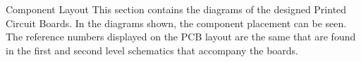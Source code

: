 \begin{customAppendixPage}{Component Layout}
This section contains the diagrams of the designed Printed Circuit Boards.  In the diagrams shown, the component placement can be seen.  The reference numbers displayed on the PCB layout are the same that are found in the first and second level schematics that accompany the boards.
\end{customAppendixPage}
\renewcommand*{\thepage}{\thesection-\arabic{page}}